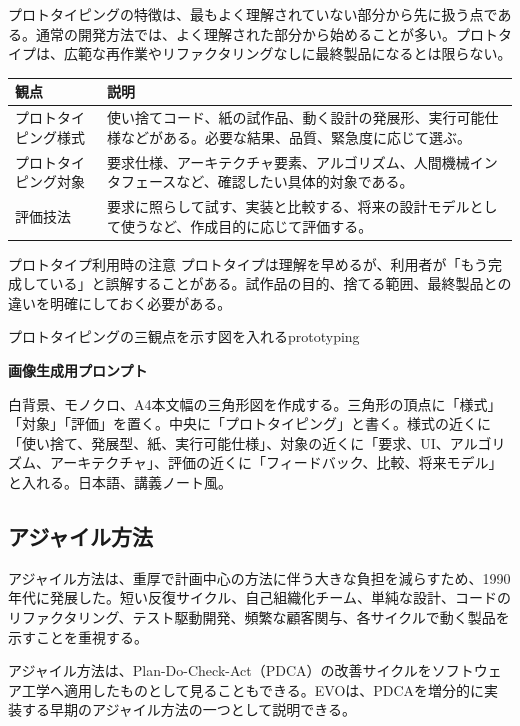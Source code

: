\documentclass[a4paper,11pt]{ltjsarticle}
\newcommand{\prompt}[1]{\par\noindent\textbf{画像生成用プロンプト}\par\small #1\normalsize}
\begin{document}
プロトタイピングの特徴は、最もよく理解されていない部分から先に扱う点である。通常の開発方法では、よく理解された部分から始めることが多い。プロトタイプは、広範な再作業やリファクタリングなしに最終製品になるとは限らない。

\begin{longtable}{>{\raggedright\arraybackslash}p{}>{\raggedright\arraybackslash}p{}}
\toprule
\textbf{観点} & \textbf{説明} \\
\midrule
プロトタイピング様式 & 使い捨てコード、紙の試作品、動く設計の発展形、実行可能仕様などがある。必要な結果、品質、緊急度に応じて選ぶ。\\
プロトタイピング対象 & 要求仕様、アーキテクチャ要素、アルゴリズム、人間機械インタフェースなど、確認したい具体的対象である。\\
評価技法 & 要求に照らして試す、実装と比較する、将来の設計モデルとして使うなど、作成目的に応じて評価する。\\
\bottomrule
\end{longtable}

\begin{pointbox}{プロトタイプ利用時の注意}
プロトタイプは理解を早めるが、利用者が「もう完成している」と誤解することがある。試作品の目的、捨てる範囲、最終製品との違いを明確にしておく必要がある。
\end{pointbox}

\begin{todobox}{プロトタイピングの三観点を示す図を入れる}{prototyping}
\prompt{白背景、モノクロ、A4本文幅の三角形図を作成する。三角形の頂点に「様式」「対象」「評価」を置く。中央に「プロトタイピング」と書く。様式の近くに「使い捨て、発展型、紙、実行可能仕様」、対象の近くに「要求、UI、アルゴリズム、アーキテクチャ」、評価の近くに「フィードバック、比較、将来モデル」と入れる。日本語、講義ノート風。}
\end{todobox}

\subsection{アジャイル方法}
アジャイル方法は、重厚で計画中心の方法に伴う大きな負担を減らすため、1990年代に発展した。短い反復サイクル、自己組織化チーム、単純な設計、コードのリファクタリング、テスト駆動開発、頻繁な顧客関与、各サイクルで動く製品を示すことを重視する。

アジャイル方法は、Plan-Do-Check-Act（PDCA）の改善サイクルをソフトウェア工学へ適用したものとして見ることもできる。EVOは、PDCAを増分的に実装する早期のアジャイル方法の一つとして説明できる。
\end{document}
